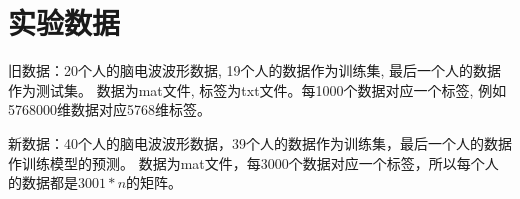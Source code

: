 \section{实验数据}

旧数据：20个人的脑电波波形数据, 19个人的数据作为训练集, 最后一个人的数据作为测试集。
数据为mat文件, 标签为txt文件。每1000个数据对应一个标签, 例如5768000维数据对应5768维标签。

新数据：40个人的脑电波波形数据，39个人的数据作为训练集，最后一个人的数据作训练模型的预测。
数据为mat文件，每3000个数据对应一个标签，所以每个人的数据都是$3001*n$的矩阵。
